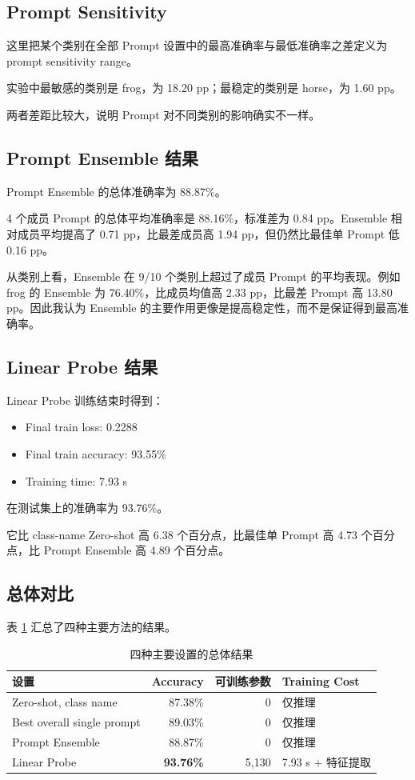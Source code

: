 \documentclass[UTF8,11pt,a4paper]{ctexart}
\begin{document}
\subsection{Prompt Sensitivity}

这里把某个类别在全部 Prompt 设置中的最高准确率与最低准确率之差定义为 prompt sensitivity range。

实验中最敏感的类别是 frog，为 18.20 pp；最稳定的类别是 horse，为 1.60 pp。

两者差距比较大，说明 Prompt 对不同类别的影响确实不一样。

\subsection{Prompt Ensemble 结果}

Prompt Ensemble 的总体准确率为 88.87\%。

4 个成员 Prompt 的总体平均准确率是 88.16\%，标准差为 0.84 pp。Ensemble 相对成员平均提高了 0.71 pp，比最差成员高 1.94 pp，但仍然比最佳单 Prompt 低 0.16 pp。

从类别上看，Ensemble 在 9/10 个类别上超过了成员 Prompt 的平均表现。例如 frog 的 Ensemble 为 76.40\%，比成员均值高 2.33 pp，比最差 Prompt 高 13.80 pp。因此我认为 Ensemble 的主要作用更像是提高稳定性，而不是保证得到最高准确率。

\subsection{Linear Probe 结果}

Linear Probe 训练结束时得到：

\begin{itemize}
    \item Final train loss: 0.2288
    \item Final train accuracy: 93.55\%
    \item Training time: 7.93 s
\end{itemize}

在测试集上的准确率为 93.76\%。

它比 class-name Zero-shot 高 6.38 个百分点，比最佳单 Prompt 高 4.73 个百分点，比 Prompt Ensemble 高 4.89 个百分点。

\subsection{总体对比}

表 \ref{tab:overall} 汇总了四种主要方法的结果。

\begin{table}[H]
\centering
\caption{四种主要设置的总体结果}
\label{tab:overall}
\begin{tabular}{lrrl}
\toprule
设置 & Accuracy & 可训练参数 & Training Cost \\
\midrule
Zero-shot, class name & 87.38\% & 0 & 仅推理 \\
Best overall single prompt & 89.03\% & 0 & 仅推理 \\
Prompt Ensemble & 88.87\% & 0 & 仅推理 \\
Linear Probe & \textbf{93.76\%} & 5,130 & 7.93 s + 特征提取 \\
\bottomrule
\end{tabular}
\end{table}
\end{document}

